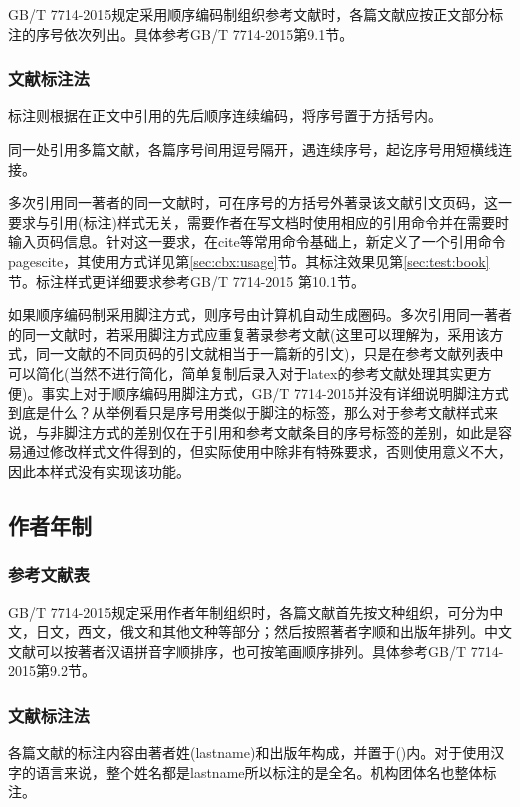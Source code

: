 GB/T 7714-2015规定采用顺序编码制组织参考文献时，各篇文献应按正文部分标注的序号依次列出。具体参考GB/T 7714-2015第9.1节。

\subsubsection{文献标注法}
标注则根据在正文中引用的先后顺序连续编码，将序号置于方括号内。

同一处引用多篇文献，各篇序号间用逗号隔开，遇连续序号，起讫序号用短横线连接。

多次引用同一著者的同一文献时，可在序号的方括号外著录该文献引文页码，这一要求与引用(标注)样式无关，需要作者在写文档时使用相应的引用命令并在需要时输入页码信息。针对这一要求，在cite等常用命令基础上，新定义了一个引用命令pagescite，其使用方式详见第\ref{sec:cbx:usage}节。其标注效果见第\ref{sec:test:book}节。标注样式更详细要求参考GB/T 7714-2015 第10.1节。

如果顺序编码制采用脚注方式，则序号由计算机自动生成圈码。多次引用同一著者的同一文献时，若采用脚注方式应重复著录参考文献(这里可以理解为，采用该方式，同一文献的不同页码的引文就相当于一篇新的引文)，只是在参考文献列表中可以简化(当然不进行简化，简单复制后录入对于latex的参考文献处理其实更方便)。事实上对于顺序编码用脚注方式，GB/T 7714-2015并没有详细说明脚注方式到底是什么？从举例看只是序号用类似于脚注的标签，那么对于参考文献样式来说，与非脚注方式的差别仅在于引用和参考文献条目的序号标签的差别，如此是容易通过修改样式文件得到的，但实际使用中除非有特殊要求，否则使用意义不大，因此本样式没有实现该功能。

\subsection{作者年制}

\subsubsection{参考文献表}

GB/T 7714-2015规定采用作者年制组织时，各篇文献首先按文种组织，可分为中文，日文，西文，俄文和其他文种等部分；然后按照著者字顺和出版年排列。中文文献可以按著者汉语拼音字顺排序，也可按笔画顺序排列。具体参考GB/T 7714-2015第9.2节。


\subsubsection{文献标注法}
各篇文献的标注内容由著者姓(lastname)和出版年构成，并置于()内。对于使用汉字的语言来说，整个姓名都是lastname所以标注的是全名。机构团体名也整体标注。

